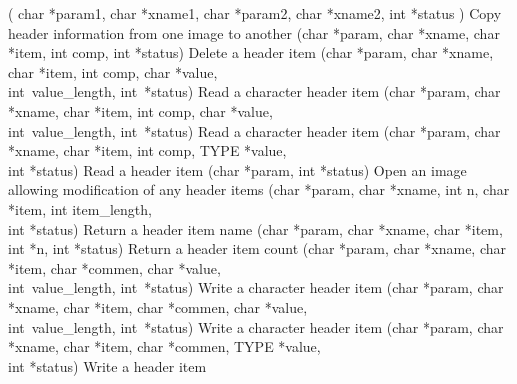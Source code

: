\documentclass[twoside,11pt,nolof]{starlink}
\begin{document}
\begin{small}
\begin{description}
     {( char *param1, char *xname1, char *param2, char *xname2, int *status )}
     {Copy header information from one image to another}
     {(char *param, char *xname, char *item, int comp, int *status)}
     {Delete a header item}
     {(char *param, char *xname, char *item, int comp, char *value,
       \\ \hspace*{3em} int~value\_length, int~*status)}
     {Read a character header item}
     {(char *param, char *xname, char *item, int comp, char *value,
       \\ \hspace*{3em} int~value\_length, int~*status)}
     {Read a character header item}
     {(char *param, char *xname, char *item, int comp, TYPE *value,
       \\ \hspace*{3em} int *status)}
     {Read a header item}
     {(char *param, int *status)}
     {Open an image allowing modification of any header items}
     {(char *param, char *xname, int n, char *item, int item\_length,
       \\ \hspace*{3em} int *status)}
     {Return a header item name}
     {(char *param, char *xname, char *item, int *n, int *status)}
     {Return a header item count}
     {(char *param, char *xname, char *item, char *commen,
       char *value, \\ \hspace*{3em} int~value\_length, int~*status)}
     {Write a character header item}
     {(char *param, char *xname, char *item, char *commen,
       char *value, \\ \hspace*{3em} int~value\_length, int~*status)}
     {Write a character header item}
     {(char *param, char *xname, char *item, char *commen,
       TYPE *value, \\ \hspace*{3em} int *status)}
     {Write a header item}
\end{description}
\end{small}
\end{document}
